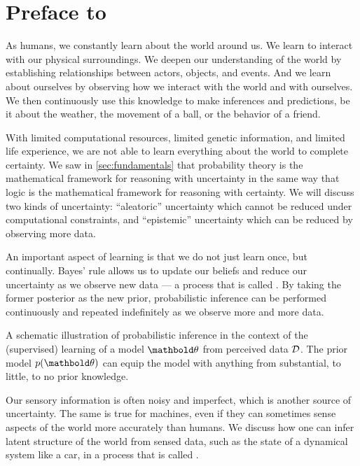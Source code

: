 \chapter*{Preface to }

As humans, we constantly learn about the world around us.
We learn to interact with our physical surroundings.
We deepen our understanding of the world by establishing relationships between actors, objects, and events.
And we learn about ourselves by observing how we interact with the world and with ourselves.
We then continuously use this knowledge to make inferences and predictions, be it about the weather, the movement of a ball, or the behavior of a friend.

With limited computational resources, limited genetic information, and limited life experience, we are not able to learn everything about the world to complete certainty.
We saw in \cref{sec:fundamentals} that probability theory is the mathematical framework for reasoning with uncertainty in the same way that logic is the mathematical framework for reasoning with certainty.
We will discuss two kinds of uncertainty: ``aleatoric'' uncertainty which cannot be reduced under computational constraints, and ``epistemic'' uncertainty which can be reduced by observing more data.

An important aspect of learning is that we do not just learn once, but continually.
Bayes' rule allows us to update our beliefs and reduce our uncertainty as we observe new data --- a process that is called .
By taking the former posterior as the new prior, probabilistic inference can be performed continuously and repeated indefinitely as we observe more and more data.

\begin{marginfigure}
	\caption{A schematic illustration of probabilistic inference in the context of the (supervised) learning of a model $\vtheta$ from perceived data $\mathcal{D}$. The prior model $p(\vtheta)$ can equip the model with anything from substantial, to little, to no prior knowledge.}
  \label{fig:perception_diagram}
\end{marginfigure}

Our sensory information is often noisy and imperfect, which is another source of uncertainty.
The same is true for machines, even if they can sometimes sense aspects of the world more accurately than humans.
We discuss how one can infer latent structure of the world from sensed data, such as the state of a dynamical system like a car, in a process that is called .

